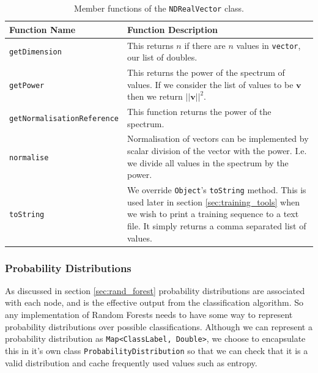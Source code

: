 \documentclass[12pt,twoside,notitlepage]{report}
\newcommand{\vc}[1]{\mathbf{#1}}
\begin{document}
                \begin{table}[H]
                    \begin{tabularx}{\textwidth}{l|X}
                        \textbf{Function Name} & \textbf{Function Description} \\
                        \hline

                        \texttt{getDimension} & 
                            This returns $n$ if there are $n$ values in \texttt{vector}, our list of doubles.  \\ 
                        \hline

                        \texttt{getPower} & 
                            This returns the power of the spectrum of values. If we consider the list of values 
                            to be $\vc{v}$ then we return $||\vc{v}||^2$. \\ 
                        \hline

                        \texttt{getNormalisationReference} & 
                            This function returns the power of the spectrum. \\
                        \hline

                        \texttt{normalise} & 
                            Normalisation of vectors can be implemented by scalar division of the vector with the power. 
                            I.e. we divide all values in the spectrum by the power. \\ 
                        \hline

                        \texttt{toString} & 
                            We override \texttt{Object}'s \texttt{toString} method. This is used later in section 
                            \ref{sec:training_tools} when we wish to print a training sequence to a text file. It 
                            simply returns a comma separated list of values. 

                    \end{tabularx}
                    \caption{Member functions of the \texttt{NDRealVector} class.}
                    \label{tab:NDRealVector}
                \end{table}



            \subsubsection{Probability Distributions} \label{sec:prob_dist}
                As discussed in section \ref{sec:rand_forest} probability distributions are associated with each node, 
                and is the effective output from the classification algorithm. So any implementation of Random Forests 
                needs to have some way to represent probability distributions over possible classifications. Although 
                we can represent a probability distribution as \texttt{Map<ClassLabel, Double>}, we choose to 
                encapsulate this in it's own class \texttt{ProbabilityDistribution} so that we can check that 
                it is a valid distribution and cache frequently used values such as entropy.
\end{document}
